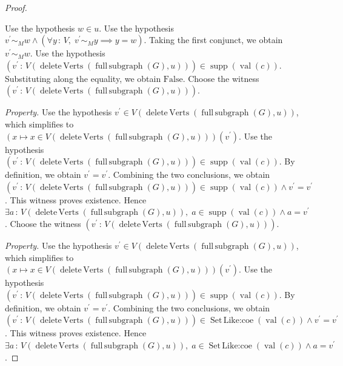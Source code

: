 \documentclass{article}
\theoremstyle{paperresult}
\newenvironment{proofstep}{\par\smallskip\ifdim\leftskip<3em\relax\advance\leftskip by 1em\relax\fi\noindent\ignorespaces}{\par\smallskip}
\begin{document}
\begin{proof}
\begin{proofstep}
\begin{proofstep}
\begin{proofstep}
\begin{proofstep}
\begin{proofstep}
\begin{proofstep}
Use the hypothesis \(w \in u\).
Use the hypothesis \(v^{'} \sim_{M} w \land \left(\forall y\, :\, V,\; v^{'} \sim_{M} y \implies y = w\right)\).
Taking the first conjunct, we obtain \(v^{'} \sim_{M} w\).
Use the hypothesis \((v^{'}\, :\, V(\operatorname{delete\,Verts}(\operatorname{full\,subgraph}(G),\allowbreak{} u))) \in \operatorname{supp}(\operatorname{val}(c))\).
Substituting along the equality, we obtain \(\mathrm{False}\).
Choose the witness \(\left(v^{'}\, :\, V(\operatorname{delete\,Verts}\left(\operatorname{full\,subgraph}(G), u\right))\right)\).
\par\smallskip\noindent\emph{Property.}\enspace
Use the hypothesis \(v^{'} \in V(\operatorname{delete\,Verts}\left(\operatorname{full\,subgraph}(G), u\right))\), which simplifies to \((x \mapsto x \in V(\operatorname{delete\,Verts}(\operatorname{full\,subgraph}(G),\allowbreak{} u)))(v^{'})\).
Use the hypothesis \((v^{'}\, :\, V(\operatorname{delete\,Verts}(\operatorname{full\,subgraph}(G),\allowbreak{} u))) \in \operatorname{supp}(\operatorname{val}(c))\).
By definition, we obtain \(v^{'} = v^{'}\).
Combining the two conclusions, we obtain \((v^{'}\, :\, V(\operatorname{delete\,Verts}(\operatorname{full\,subgraph}(G),\allowbreak{} u))) \in \operatorname{supp}(\operatorname{val}(c)) \land v^{'} = v^{'}\).
This witness proves existence. Hence \(\exists a\, :\, V(\operatorname{delete\,Verts}(\operatorname{full\,subgraph}(G),\allowbreak{} u)),\; a \in \operatorname{supp}(\operatorname{val}(c)) \land a = v^{'}\).
Choose the witness \(\left(v^{'}\, :\, V(\operatorname{delete\,Verts}\left(\operatorname{full\,subgraph}(G), u\right))\right)\).
\par\smallskip\noindent\emph{Property.}\enspace
Use the hypothesis \(v^{'} \in V(\operatorname{delete\,Verts}\left(\operatorname{full\,subgraph}(G), u\right))\), which simplifies to \((x \mapsto x \in V(\operatorname{delete\,Verts}(\operatorname{full\,subgraph}(G),\allowbreak{} u)))(v^{'})\).
Use the hypothesis \((v^{'}\, :\, V(\operatorname{delete\,Verts}(\operatorname{full\,subgraph}(G),\allowbreak{} u))) \in \operatorname{supp}(\operatorname{val}(c))\).
By definition, we obtain \(v^{'} = v^{'}\).
Combining the two conclusions, we obtain \((v^{'}\, :\, V(\operatorname{delete\,Verts}(\operatorname{full\,subgraph}(G),\allowbreak{} u))) \in \operatorname{Set\,Like\mathord{:}coe}(\operatorname{val}(c)) \land v^{'} = v^{'}\).
This witness proves existence. Hence \(\exists a\, :\, V(\operatorname{delete\,Verts}(\operatorname{full\,subgraph}(G),\allowbreak{} u)),\; a \in \operatorname{Set\,Like\mathord{:}coe}(\operatorname{val}(c)) \land a = v^{'}\).

\end{proofstep}
\end{proofstep}
\end{proofstep}
\end{proofstep}
\end{proofstep}
\end{proofstep}
\end{proof}
\end{document}
